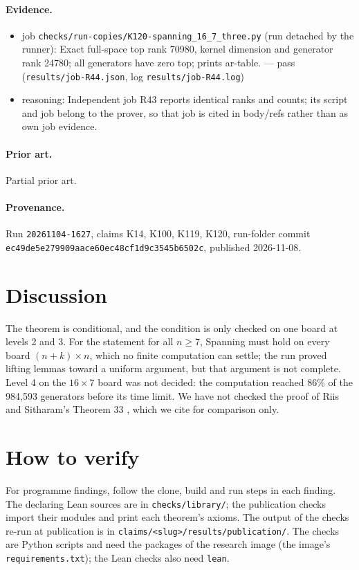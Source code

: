 \documentclass{article}
\begin{document}
\paragraph{Evidence.}
\begin{itemize}
\item job \texttt{checks/run-copies/K120-spanning\_16\_7\_three.py} (run detached by the runner): Exact full-space top rank 70980, kernel dimension and generator rank 24780; all generators have zero top; prints ar-table. --- pass (\texttt{results/job-R44.json}, log \texttt{results/job-R44.log})
\item reasoning: Independent job R43 reports identical ranks and counts; its script and job belong to the prover, so that job is cited in body/refs rather than as own job evidence.
\end{itemize}

\paragraph{Prior art.} Partial prior art.


\paragraph{Provenance.}
Run \texttt{20261104-1627}, claims K14, K100, K119, K120, run-folder commit \texttt{ec49de5e279909aace60ec48cf1d9c3545b6502c}, published 2026-11-08.

\section{Discussion}

The theorem is conditional, and the condition is only checked on one board at levels 2 and 3. For the
statement for all $n\ge7$, Spanning must hold on every board $(n+k)\times n$, which no finite
computation can settle; the run proved lifting lemmas toward a uniform argument, but that argument is
not complete. Level 4 on the $16\times7$ board was not decided: the computation reached 86\% of the
984,593 generators before its time limit. We have not checked the proof of Riis and Sitharam's
Theorem 33 \cite{riis1997nonconstant}, which we cite for comparison only.

\section{How to verify}

For programme findings, follow the clone, build and run steps in each finding. The declaring Lean sources are in \texttt{checks/library/}; the publication checks import their modules and print each theorem's axioms. The output of the checks re-run at publication is in \texttt{claims/<slug>/results/publication/}. The checks are Python scripts and need the packages of the research image (the image's \texttt{requirements.txt}); the Lean checks also need \texttt{lean}.



\end{document}
